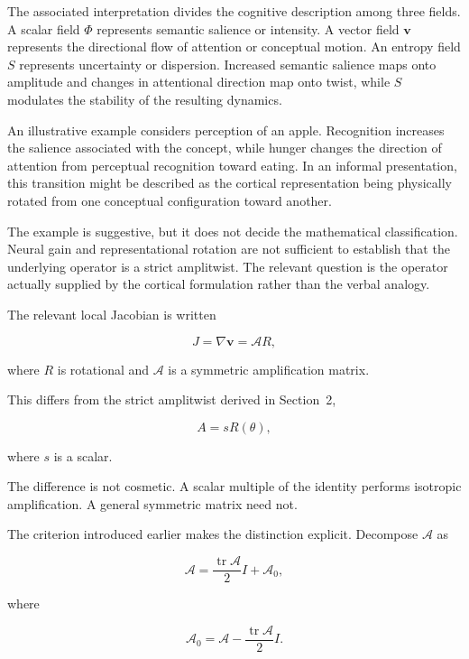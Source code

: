 \documentclass[11pt]{article}
\begin{document}
The associated interpretation divides the cognitive description among three fields. A scalar field $\Phi$ represents semantic salience or intensity. A vector field $\mathbf v$ represents the directional flow of attention or conceptual motion. An entropy field $S$ represents uncertainty or dispersion. Increased semantic salience maps onto amplitude and changes in attentional direction map onto twist, while $S$ modulates the stability of the resulting dynamics.

An illustrative example considers perception of an apple. Recognition increases the salience associated with the concept, while hunger changes the direction of attention from perceptual recognition toward eating. In an informal presentation, this transition might be described as the cortical representation being physically rotated from one conceptual configuration toward another.

The example is suggestive, but it does not decide the mathematical classification. Neural gain and representational rotation are not sufficient to establish that the underlying operator is a strict amplitwist. The relevant question is the operator actually supplied by the cortical formulation rather than the verbal analogy.

The relevant local Jacobian is written

\begin{equation}
J=\nabla\mathbf v=\mathcal A R,
\end{equation}

where $R$ is rotational and $\mathcal A$ is a symmetric amplification matrix.

This differs from the strict amplitwist derived in Section~2,

\begin{equation}
A=sR(\theta),
\end{equation}

where $s$ is a scalar.

The difference is not cosmetic. A scalar multiple of the identity performs isotropic amplification. A general symmetric matrix need not.

The criterion introduced earlier makes the distinction explicit. Decompose $\mathcal A$ as

\begin{equation}
\mathcal A
=
\frac{\operatorname{tr}\mathcal A}{2}I+\mathcal A_0,
\end{equation}

where

\begin{equation}
\mathcal A_0
=
\mathcal A
-
\frac{\operatorname{tr}\mathcal A}{2}I.
\end{equation}
\end{document}
